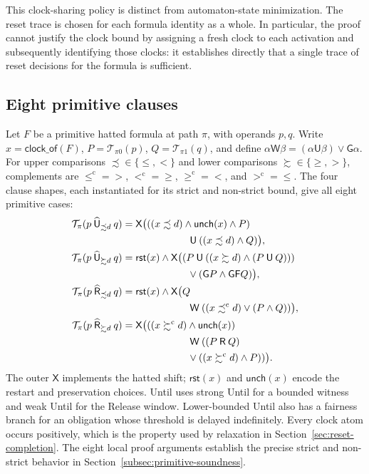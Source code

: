 \documentclass{ieeeaccess}
\newcommand{\Until}{\mathbin{\mathsf{U}}}
\newcommand{\Release}{\mathbin{\mathsf{R}}}
\newcommand{\hUntil}{\mathbin{\widehat{\mathsf{U}}}}
\newcommand{\hRelease}{\mathbin{\widehat{\mathsf{R}}}}
\newcommand{\Next}{\mathsf{X}}
\newcommand{\Always}{\mathsf{G}}
\newcommand{\Eventually}{\mathsf{F}}
\newcommand{\WeakUntil}{\mathbin{\mathsf{W}}}
\newcommand{\Reset}{\mathsf{rst}}
\newcommand{\Unch}{\mathsf{unch}}
\newcommand{\T}{\mathcal{T}}
\begin{document}
This clock-sharing policy is distinct from automaton-state minimization. The
reset trace is chosen for each formula identity as a whole. In particular,
the proof cannot justify the clock bound
by assigning a fresh clock to each activation and subsequently identifying
those clocks: it establishes directly that a single trace of reset decisions
for the formula is sufficient.

\subsection{Eight primitive clauses}
\label{sec:mtlbuchi}
Let $F$ be a primitive hatted formula at path $\pi$, with operands $p,q$.
Write $x=\mathsf{clock\_of}(F)$, $P=\T_{\pi0}(p)$,
$Q=\T_{\pi1}(q)$, and define
$\alpha\WeakUntil\beta=(\alpha\Until\beta)\lor\Always\alpha$.
For upper comparisons $\precsim\in\{\le,<\}$ and lower comparisons
$\succsim\in\{\ge,>\}$, complements are
$\le^{\mathrm c}=>$, $<^{\mathrm c}=\ge$, $\ge^{\mathrm c}=<$, and
$>^{\mathrm c}=\le$. The four clause shapes, each instantiated for its
strict and non-strict bound, give all eight primitive cases:
\begin{align}
\T_\pi(p\hUntil_{\precsim d}q)
 &=\Next\bigl(((x\precsim d)\land\Unch(x)\land P)\nonumber\\
 &\hspace{23mm}\Until((x\precsim d)\land Q)\bigr),\label{eq:t-hule}\\
\T_\pi(p\hUntil_{\succsim d}q)
 &=\Reset(x)\land\Next\bigl((P\Until((x\succsim d)\land(P\Until Q)))\nonumber\\
 &\hspace{23mm}\lor(\Always P\land\Always\Eventually Q)\bigr),\label{eq:t-huge}\\
\T_\pi(p\hRelease_{\precsim d}q)
 &=\Reset(x)\land\Next\bigl(Q\nonumber\\
 &\hspace{23mm}\WeakUntil((x\mathrel{\precsim^{\mathrm c}}d)\lor(P\land Q))\bigr),\label{eq:t-hrle}\\
\T_\pi(p\hRelease_{\succsim d}q)
 &=\Next\bigl(((x\mathrel{\succsim^{\mathrm c}}d)\land\Unch(x))\nonumber\\
 &\hspace{23mm}\WeakUntil((P\Release Q)\nonumber\\
 &\hspace{23mm}\lor((x\mathrel{\succsim^{\mathrm c}}d)\land P))\bigr).
 \label{eq:t-hrge}
\end{align}
The outer $\Next$ implements the hatted shift; $\Reset(x)$ and $\Unch(x)$
encode the restart and preservation choices. Until uses strong Until for a
bounded witness and weak Until for the Release window. Lower-bounded Until
also has a fairness branch for an obligation whose threshold is delayed
indefinitely. Every clock atom occurs positively, which is the property used
by relaxation in Section~\ref{sec:reset-completion}. The eight local proof
arguments establish the precise strict and non-strict behavior in
Section~\ref{subsec:primitive-soundness}.
\end{document}
